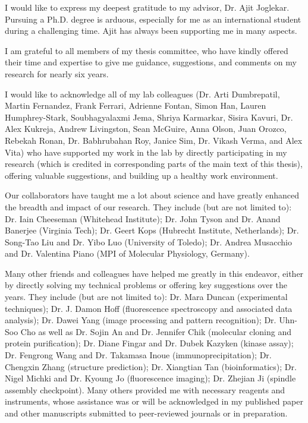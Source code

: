 I would like to express my deepest gratitude to my advisor, Dr. Ajit Joglekar. Pursuing a Ph.D. degree is arduous, especially for me as an international student during a challenging time. Ajit has always been supporting me in many aspects. %

I am grateful to all members of my thesis committee, who have kindly offered their time and expertise to give me guidance, suggestions, and comments on my research for nearly six years.

I would like to acknowledge all of my lab colleagues (Dr. Arti Dumbrepatil, Martin Fernandez, Frank Ferrari, Adrienne Fontan, Simon Han, Lauren Humphrey-Stark, Soubhagyalaxmi Jema, Shriya Karmarkar, Sisira Kavuri, Dr. Alex Kukreja, Andrew Livingston, Sean McGuire, Anna Olson, Juan Orozco, Rebekah Ronan, Dr. Babhrubahan Roy, Janice Sim, Dr. Vikash Verma, and Alex Vita) who have supported my work in the lab by directly participating in my research (which is credited in corresponding parts of the main text of this thesis), offering valuable suggestions, and building up a healthy work environment.

Our collaborators have taught me a lot about science and have greatly enhanced the breadth and impact of our research. They include (but are not limited to): Dr. Iain Cheeseman (Whitehead Institute); Dr. John Tyson and Dr. Anand Banerjee (Virginia Tech); Dr. Geert Kops (Hubrecht Institute, Netherlands); Dr. Song-Tao Liu and Dr. Yibo Luo (University of Toledo); Dr. Andrea Musacchio and Dr. Valentina Piano (MPI of Molecular Physiology, Germany).

Many other friends and colleagues have helped me greatly in this endeavor, either by directly solving my technical problems or offering key suggestions over the years. They include (but are not limited to): Dr. Mara Duncan (experimental techniques); Dr. J. Damon Hoff (fluorescence spectroscopy and associated data analysis); Dr. Dawei Yang (image processing and pattern recognition); Dr. Uhn-Soo Cho as well as Dr. Sojin An and Dr. Jennifer Chik (molecular cloning and protein purification); Dr. Diane Fingar and Dr. Dubek Kazyken (kinase assay); Dr. Fengrong Wang and Dr. Takamasa Inoue (immunoprecipitation); Dr. Chengxin Zhang (structure prediction); Dr. Xiangtian Tan (bioinformatics); Dr. Nigel Michki and Dr. Kyoung Jo (fluorescence imaging); Dr. Zhejian Ji (spindle assembly checkpoint). Many others provided me with necessary reagents and instruments, whose assistance was or will be acknowledged in my published paper \cite{eSAC} and other manuscripts submitted to peer-reviewed journals \cite{KImotifPaper, Paper3} or in preparation.

